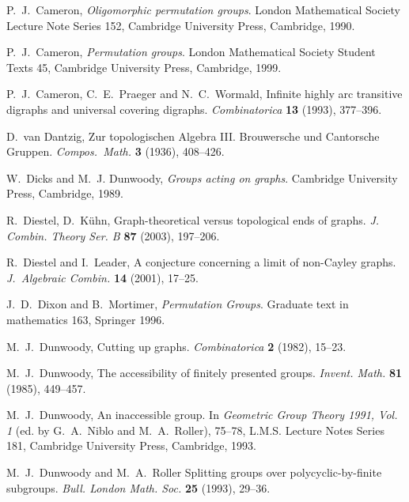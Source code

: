 \documentclass{emsprocart}
\theoremstyle{definition}
\begin{document}
\begin{thebibliography}{99}
 P.\ J.\ Cameron,
{\em Oligomorphic permutation groups}.
London Mathematical Society Lecture Note Series 152,
Cambridge University Press, Cambridge, 1990.

 P.\ J.\ Cameron,
{\em Permutation groups}.
London Mathematical Society Student Texts 45,
Cambridge University Press, Cambridge, 1999.

  P.\ J.\ Cameron, C.\ E.\ Praeger and N.\ C.~Wormald,
                Infinite highly arc transitive digraphs and universal
                covering digraphs.
                {\it Combinatorica} {\bf 13} (1993), 377--396.

 D.\ van Dantzig,
                Zur topologischen Algebra III.  Brouwersche und
                Cantorsche Gruppen.
                {\em Compos.\ Math.} {\bf 3}  (1936), 408--426.

 W.~Dicks and M.~J. Dunwoody,
                {\em Groups acting on graphs}.
                Cambridge University Press, Cambridge, 1989.

 R.~Diestel, D.~K\"uhn,
                Graph-theoretical versus topological ends of graphs.
                {\em J. Combin. Theory Ser. B} {\bf 87} (2003),
                197--206.

 R.\ Diestel and I.\ Leader,
                A conjecture concerning a limit of non-Cayley graphs.
                {\em J.~Algebraic Combin.} {\bf 14} (2001), 17--25.

  J.\ D.\ Dixon and B.\ Mortimer,
                {\em Permutation Groups}.
                Graduate text in mathematics 163, Springer 1996.

 M.~J.~Dunwoody,
                Cutting up graphs.
                {\em Combinatorica} {\bf 2} (1982), 15--23.

 M.~J.~Dunwoody,
                The accessibility of finitely presented groups.
                {\em Invent. Math.} {\bf 81} (1985), 449--457.

 M.~J.~Dunwoody,
                An inaccessible group.  In
                {\em Geometric Group Theory 1991, Vol. 1}
                (ed. by G.~A.~Niblo and M.~A.~Roller),
                75--78,
                L.M.S. Lecture Notes Series 181, Cambridge University
                Press, Cambridge, 1993.

 M.\ J.\ Dunwoody and M.\ A.\ Roller
                Splitting groups over polycyclic-by-finite subgroups.
                {\em Bull. London Math. Soc.} {\bf 25} (1993), 29--36.


\end{thebibliography}
\end{document}
